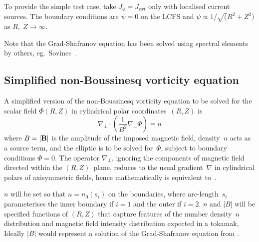 To provide the simple test case, take $J_\phi=J_{ext}$ only with localised current sources.
The boundary conditions are $\psi=0$ on the LCFS
and $\psi \propto 1/\sqrt(R^2+Z^2)$ as $R,\;Z \rightarrow \infty$.

Note that the Grad-Shafranov equation has been solved using spectral elements by
others, eg.\ Sovinec~\cite{Ho14Solv}.

\subsection{Simplified non-Boussinesq vorticity equation} \label{sec:boussimp}
A simplified version of the non-Boussinesq vorticity equation to be solved for
the scalar field $\Phi(R,Z)$ in cylindrical polar coordinates~$(R,Z)$ is
\begin{equation}\label{eq:ellsimp}
\nabla_\perp \cdot \left( \frac{1}{B^2}  \nabla_\perp \Phi \right) = n
\end{equation}
where $B=|{\bf B}|$ is the amplitude of the imposed magnetic field,
density~$n$ acts as a source term, and the elliptic is to be solved
for~$\Phi$, subject to boundary conditions $\Phi=0$. The operator $\nabla_\perp$,
ignoring the components of magnetic field directed within the $(R,Z)$~plane,
reduces to the usual gradient~$\nabla$ in cylindrical polars of axisymmetric
fields, hence mathematically 
is equivalent to~.

$n$ will be set so that $n=n_0(s_i)$ on the boundaries,
where arc-length~$s_i$
parameterises the inner boundary if $i=1$ and the outer if $i=2$.
$n$ and $|B|$ will be specified functions of $(R,Z)$ that capture features
of the number density~$n$ distribution and magnetic field intensity distribution
expected in a tokamak,
Ideally $|B|$ would represent a solution of the Grad-Shafranov equation from .
